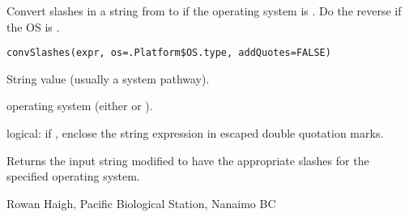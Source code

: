 \documentclass[letterpaper]{book}
\begin{document}
\begin{Description}\relax
Convert slashes in a string from \samp{/} to \samp{\bsl{}\bsl{}} if the 
operating system is . Do the reverse if the OS is
.
\end{Description}
\begin{Usage}
\begin{verbatim}
convSlashes(expr, os=.Platform$OS.type, addQuotes=FALSE)
\end{verbatim}
\end{Usage}
\begin{Arguments}
\begin{ldescription}
\item[\code{expr}] String value (usually a system pathway). 
\item[\code{os}] operating system (either  or ). 
\item[\code{addQuotes}] logical: if , enclose the string expression
in escaped double quotation marks. 
\end{ldescription}
\end{Arguments}
\begin{Value}
Returns the input string modified to have the appropriate slashes for the 
specified operating system.
\end{Value}
\begin{Author}\relax
Rowan Haigh, Pacific Biological Station, Nanaimo BC
\end{Author}
\end{document}
